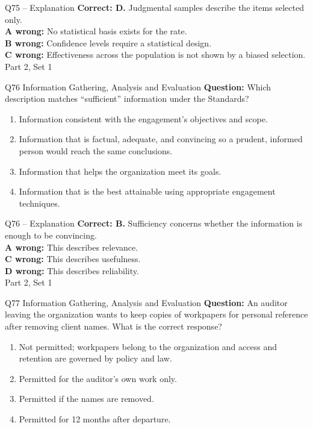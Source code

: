 \documentclass[aspectratio=169,10pt]{beamer}
\begin{document}
\begin{frame}[t]{Q75 -- Explanation}
	\footnotesize
	\textbf{Correct: D.} Judgmental samples describe the items selected only. \\[5pt]
\textbf{A wrong:} No statistical basis exists for the rate. \\[3pt]
\textbf{B wrong:} Confidence levels require a statistical design. \\[3pt]
\textbf{C wrong:} Effectiveness across the population is not shown by a biased selection. \\[3pt]
	\vfill {\tiny Part 2, Set 1}
\end{frame}
\begin{frame}[t]{Q76 \hfill {\scriptsize Information Gathering, Analysis and Evaluation}}
	\small
	\textbf{Question:} Which description matches ``sufficient'' information under the Standards?
	\begin{enumerate}[label=\Alph*.,itemsep=1pt,topsep=3pt]
			\item Information consistent with the engagement's objectives and scope.
			\item Information that is factual, adequate, and convincing so a prudent, informed person would reach the same conclusions.
			\item Information that helps the organization meet its goals.
			\item Information that is the best attainable using appropriate engagement techniques.
	\end{enumerate}
\end{frame}
\begin{frame}[t]{Q76 -- Explanation}
	\footnotesize
	\textbf{Correct: B.} Sufficiency concerns whether the information is enough to be convincing. \\[5pt]
\textbf{A wrong:} This describes relevance. \\[3pt]
\textbf{C wrong:} This describes usefulness. \\[3pt]
\textbf{D wrong:} This describes reliability. \\[3pt]
	\vfill {\tiny Part 2, Set 1}
\end{frame}
\begin{frame}[t]{Q77 \hfill {\scriptsize Information Gathering, Analysis and Evaluation}}
	\small
	\textbf{Question:} An auditor leaving the organization wants to keep copies of workpapers for personal reference after removing client names. What is the correct response?
	\begin{enumerate}[label=\Alph*.,itemsep=1pt,topsep=3pt]
			\item Not permitted; workpapers belong to the organization and access and retention are governed by policy and law.
			\item Permitted for the auditor's own work only.
			\item Permitted if the names are removed.
			\item Permitted for 12 months after departure.
	\end{enumerate}
\end{frame}
\end{document}
